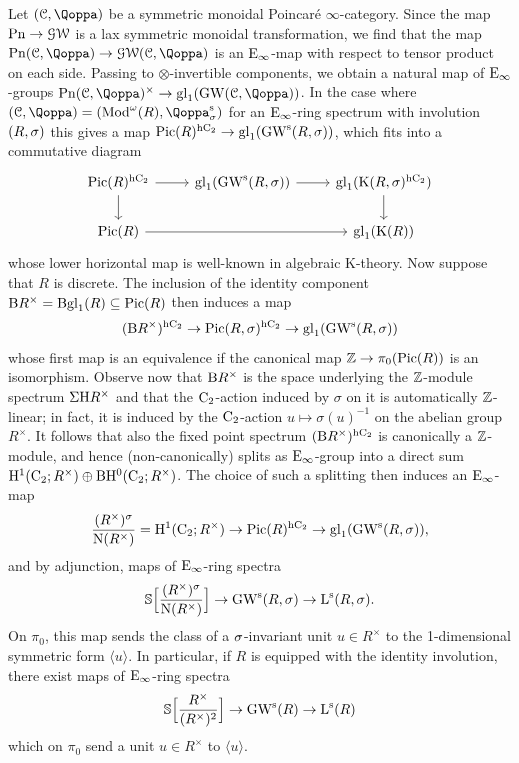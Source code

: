 \begin{construction}
\label{construction:Bgl-to-gl}%
Let $(\C,\QF)$ be a symmetric monoidal Poincar\'e $\infty$-category. Since the map $\mathrm{Pn} \to \operatorname{\mathcal{GW}}$ is a lax symmetric monoidal transformation, we find that the map $\Poinc(\C,\QF) \to \GWspace(\C,\QF)$ is an ${\mathrm{E}_{\infty}}$-map with respect to tensor product on each side. Passing to $\otimes$-invertible components, we obtain a natural map of ${\mathrm{E}_{\infty}}$-groups $\Poinc(\C,\QF)^\times \to \gl_1(\GW(\C,\QF))$.
In the case where $(\C,\QF) = (\Modp{R},\QF^{\sym}_{\sig})$ for an ${\mathrm{E}_{\infty}}$-ring spectrum with involution $(R,\sigma)$ %
this gives a map $\operatorname{Pic}(R)^{{\mathrm{h}\mathrm{C_2}}} \to \mathrm{gl}_1(\operatorname{GW}^{\mathrm{s}}(R,\sigma))$,
which fits into a commutative diagram
\[
\begin{tikzcd}
	\Pic(R)^{\hC} \ar[r] \ar[d] & \gl_1(\GW^\s(R,\sig)) \ar[r] & \gl_1(\K(R,\sig)^{\hC}) \ar[d] \\
	\Pic(R) \ar[rr] && \gl_1(\K(R))
\end{tikzcd}
\]
whose lower horizontal map is well-known in algebraic K-theory.
Now suppose that $R$ is discrete. The inclusion of the identity component $\mathrm{B} R^{\times} = \mathrm{Bgl}_1(R) \subseteq \operatorname{Pic}(R)$
then induces a map
\[
(\mathrm{B} R^\times)^{{\mathrm{h}\mathrm{C_2}}} \to \operatorname{Pic}(R,\sigma)^{{\mathrm{h}\mathrm{C_2}}} \to \mathrm{gl}_1(\operatorname{GW}^{\mathrm{s}}(R,\sigma))
\]
whose first map is an equivalence if the canonical map $\mathbb{Z} \to \pi_0(\operatorname{Pic}(R))$ is an isomorphism.
Observe now that $\mathrm{B} R^\times$ is the space underlying the $\mathbb{Z}$-module spectrum $\Sigma \mathrm{H} R^\times$ and that the $\mathrm{C_2}$-action induced by $\sigma$ on it is automatically $\mathbb{Z}$-linear; in fact, it is induced by the $\mathrm{C_2}$-action $u \mapsto \sigma(u)^{-1}$ on the abelian group $R^\times$. It follows that also the fixed point spectrum $(\mathrm{B} R^\times)^{{\mathrm{h}\mathrm{C_2}}}$ is canonically a $\mathbb{Z}$-module, and hence (non-canonically) splits as ${\mathrm{E}_{\infty}}$-group into a direct sum $\mathrm{H}^1(\mathrm{C_2};R^\times)\oplus \mathrm{B} \mathrm{H}^0(\mathrm{C_2};R^\times)$.
The choice of such a splitting then induces an ${\mathrm{E}_{\infty}}$-map 
\[
\frac{(R^\times)^\sigma}{\mathrm{N}(R^\times)} = \mathrm{H}^1(\mathrm{C_2};R^\times) \to \operatorname{Pic}(R)^{{\mathrm{h}\mathrm{C_2}}} \to \mathrm{gl}_1(\operatorname{GW}^{\mathrm{s}}(R,\sigma)),
\]
and by adjunction, %
maps of ${\mathrm{E}_{\infty}}$-ring spectra
\[
\mathbb{S}\Bigl[\frac{(R^\times)^\sigma}{\mathrm{N}(R^\times)}\Bigr] \to \operatorname{GW}^{\mathrm{s}}(R,\sigma) \to \operatorname L^{\mathrm{s}}(R,\sigma).
\]
On $\pi_0$, this map sends the class of a $\sigma$-invariant unit $u \in R^\times$ to the 1-dimensional symmetric form $\langle u \rangle$. In particular, if $R$ is equipped with the identity involution, there exist maps of ${\mathrm{E}_{\infty}}$-ring spectra
\[
\mathbb{S}\Bigl[\frac{R^\times}{(R^\times)^2}\Bigr] \to \operatorname{GW}^{\mathrm{s}}(R) \to \operatorname L^{\mathrm{s}}(R)
\]
which on $\pi_0$ send a unit $u \in R^\times$ to $\langle u \rangle$.
\end{construction}


